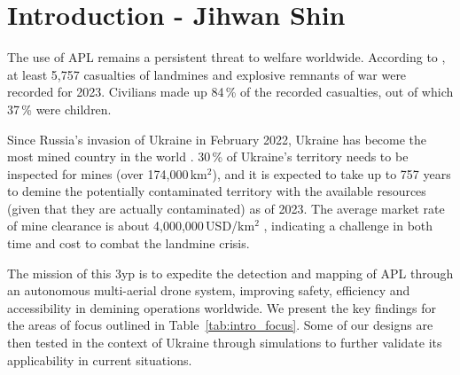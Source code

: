 \section{Introduction - Jihwan Shin} \label{introduction}

The use of \gls{APL} remains a persistent threat to welfare worldwide. According to \cite{icbl2024landmine}, at least 5,757 casualties of landmines and explosive remnants of war were recorded for 2023. Civilians made up 84\,\% of the recorded casualties, out of which 37\,\% were children. 

Since Russia's invasion of Ukraine in February 2022, Ukraine has become the most mined country in the world \cite{globsec2024ukraine}. 30\,\% of Ukraine's territory needs to be inspected for mines (over 174,000\,km$^2$), and it is expected to take up to 757 years to demine the potentially contaminated territory with the available resources (given that they are actually contaminated) as of 2023. The average market rate of mine clearance is about 4,000,000\,USD/km$^2$ \cite{globsec2023ukraine}, indicating a challenge in both time and cost to combat the landmine crisis. 

The mission of this \gls{3yp} is to expedite the detection and mapping of \gls{APL} through an autonomous multi-aerial drone system, improving safety, efficiency and accessibility in demining operations worldwide. We present the key findings for the areas of focus outlined in Table~\ref{tab:intro_focus}. Some of our designs are then tested in the context of Ukraine through simulations to further validate its applicability in current situations.  

